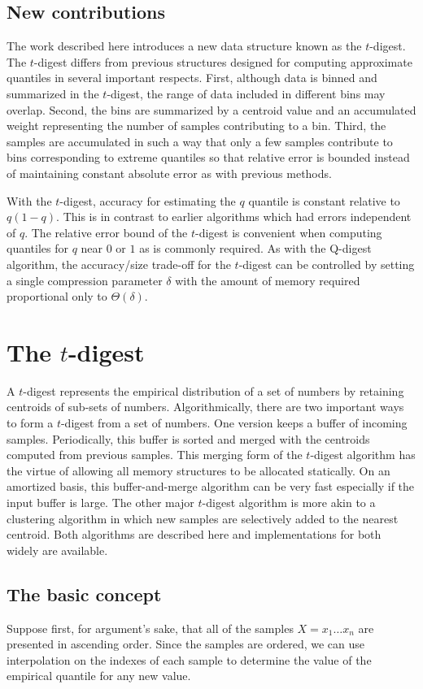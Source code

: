 \documentclass[11pt]{amsart}
\begin{document}
\subsection{New contributions}
The work described here introduces a new data structure known as the $t$-digest. The $t$-digest differs from previous structures designed for computing approximate quantiles in several important respects. First, although data is binned and summarized in the $t$-digest, the range of data included in different bins may overlap. Second, the bins are summarized by a centroid value and an accumulated weight representing the number of samples contributing to a bin. Third, the samples are accumulated in such a way that only a few samples contribute to bins corresponding to extreme quantiles so that relative error is bounded instead of maintaining constant absolute error as with previous methods.

With the $t$-digest, accuracy for estimating the $q$ quantile is constant relative to $q(1-q)$.  This is in contrast to earlier algorithms which had errors independent of $q$.  The relative error bound of the $t$-digest is convenient when computing quantiles for $q$ near $0$ or $1$ as is commonly required.  As with the Q-digest algorithm, the accuracy/size trade-off for the $t$-digest can be controlled by setting a single compression parameter $\delta$ with the amount of memory required proportional only to $\Theta(\delta)$. 
\section{The $t$-digest}
A $t$-digest represents the empirical distribution of a set of numbers by retaining centroids of sub-sets of numbers. Algorithmically, there are two important ways to form a $t$-digest from a set of numbers. One version keeps a buffer of incoming samples. Periodically, this buffer is sorted and merged with the centroids computed from previous samples. This merging form of the $t$-digest algorithm has the virtue of allowing all memory structures to be allocated statically. On an amortized basis, this buffer-and-merge algorithm can be very fast especially if the input buffer is large. The other major $t$-digest algorithm is more akin to a clustering algorithm in which new samples are selectively added to the nearest centroid.  Both algorithms are described here and implementations for both widely are available. 

\subsection{The basic concept}
Suppose first, for argument's sake, that all of the samples $X=x_1 \ldots x_n$ are presented in ascending order. Since the samples are ordered, we can use interpolation on the indexes of each sample to determine the value of the empirical quantile for any new value. 
\end{document}

